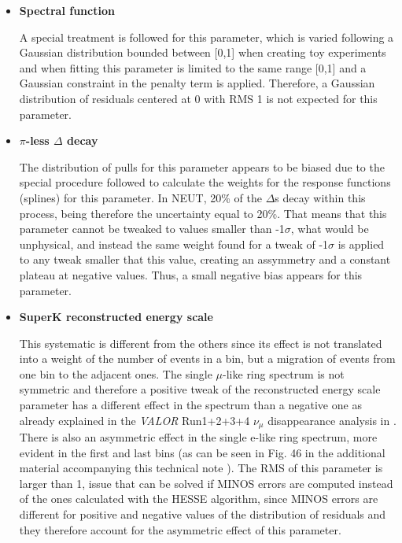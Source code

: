 \begin{itemize}
\item{\textbf{Spectral function}

A special treatment is followed for this parameter, which is varied following a Gaussian distribution bounded between [0,1] when creating toy experiments
and when fitting this parameter is limited to the same range [0,1] and a Gaussian constraint in the penalty term is applied. Therefore, a Gaussian distribution of residuals
centered at 0 with RMS 1 is not expected for this parameter.
}

\item{\textbf{$\pi$-less $\Delta$ decay}

The distribution of pulls for this parameter appears to be biased due to the special procedure followed to calculate the weights for the response functions (splines) for this parameter. 
In NEUT, 20\% of the $\Delta$s decay within this process, being therefore the uncertainty equal to 20\%. That means that this parameter cannot be tweaked to values smaller than -1$\sigma$, what would be unphysical, and instead the same weight found for a tweak of -1$\sigma$ is applied to any tweak smaller that this value, creating an assymmetry and a constant plateau at negative values. Thus, a small negative bias appears for this parameter.
}

\item{\textbf{SuperK reconstructed energy scale}

This systematic is different from the others since its effect is not translated into a weight of the number of events in a bin, but a migration of events from one bin to the adjacent ones. 
The single $\mu$-like ring spectrum is not symmetric and therefore a positive tweak of the reconstructed energy scale parameter has a different effect in the spectrum than a negative one as already explained in the \textit{VALOR} Run1+2+3+4 $\nu_{\mu}$ disappearance analysis in \cite{OurRun1234DisappAnalysis3Flavour}. There is also an asymmetric effect in the single e-like ring spectrum, more evident in the first and last bins (as can be seen in  Fig. 46 in the additional material accompanying this technical note \cite{AdditionalMaterial}). The RMS of this parameter is larger than 1, issue that can be solved if MINOS errors are computed instead of the ones calculated with the HESSE algorithm, since MINOS errors are different for positive and negative values of the distribution of residuals and they therefore account for the asymmetric effect of this parameter. %
}


\end{itemize}
